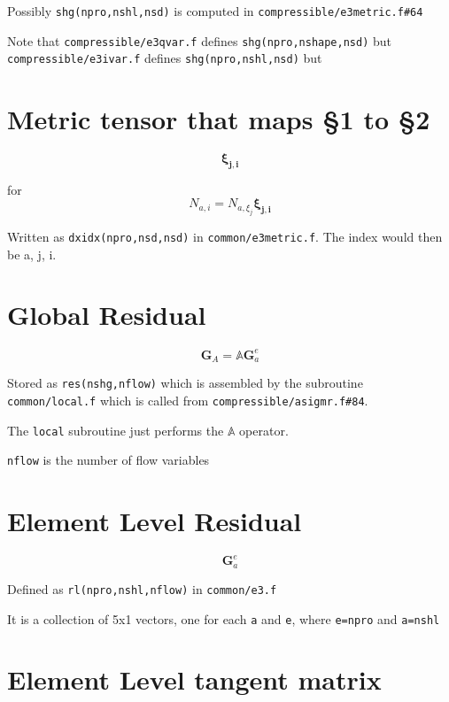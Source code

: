 \documentclass[12pt, letterpaper, twoside]{article}
\renewcommand{\vec}[1]{\bm{#1}}
\newcommand{\ttt}[1]{\texttt{#1}}
\newcommand{\0}{\vec{0}}
\begin{document}
    Possibly \texttt{shg(npro,nshl,nsd)}  is computed in \texttt{compressible/e3metric.f\#64}

    Note that \ttt{compressible/e3qvar.f} defines \texttt{shg(npro,nshape,nsd)} but \ttt{compressible/e3ivar.f} defines \texttt{shg(npro,nshl,nsd)} but 

\section{Metric tensor that maps \S1 to \S2}

\begin{equation}
    \vec{\xi_{j,i}}
\end{equation}

for 
\begin{equation}
    N_{a,i} = N_{a,\xi_j}\vec{\xi_{j,i}}
\end{equation}

Written as \texttt{dxidx(npro,nsd,nsd)} in \texttt{common/e3metric.f}. The index would then be a, j, i.

\section{Global Residual}
\begin{equation}
    \vec{G}_A = \mathbb{A} \vec{G}^e_a
\end{equation}

Stored as \ttt{res(nshg,nflow)} which is assembled by the subroutine \ttt{common/local.f} which is called from \ttt{compressible/asigmr.f\#84}.

The \ttt{local} subroutine just performs the \(\mathbb{A}\) operator.

\ttt{nflow} is the number of flow variables

\section{Element Level Residual}

    \begin{equation}
        \vec{G}^e_a
    \end{equation}

    Defined as \texttt{rl(npro,nshl,nflow)} in \texttt{common/e3.f} 

    It is a collection of 5x1 vectors, one for each \ttt{a} and \ttt{e}, where \ttt{e=npro} and \ttt{a=nshl}

\section{Element Level tangent matrix}
\end{document}
